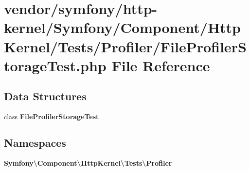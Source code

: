 \section{vendor/symfony/http-\/kernel/\+Symfony/\+Component/\+Http\+Kernel/\+Tests/\+Profiler/\+File\+Profiler\+Storage\+Test.php File Reference}
\label{_file_profiler_storage_test_8php}
\subsection*{Data Structures}
\begin{DoxyCompactItemize}
\item 
class {\bf File\+Profiler\+Storage\+Test}
\end{DoxyCompactItemize}
\subsection*{Namespaces}
\begin{DoxyCompactItemize}
\item 
 {\bf Symfony\textbackslash{}\+Component\textbackslash{}\+Http\+Kernel\textbackslash{}\+Tests\textbackslash{}\+Profiler}
\end{DoxyCompactItemize}
